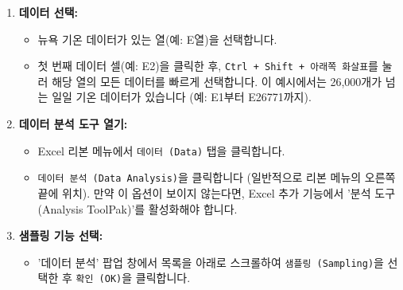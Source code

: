 \documentclass[11pt,a4paper]{book}
\newcommand{\excel}[1]{\texttt{#1}}
\theoremstyle{definition}
\begin{document}
\begin{enumerate}
    \item \textbf{데이터 선택:}
    \begin{itemize}
        \item 뉴욕 기온 데이터가 있는 열(예: E열)을 선택합니다.
        \item 첫 번째 데이터 셀(예: E2)을 클릭한 후, \excel{Ctrl + Shift + 아래쪽 화살표}를 눌러 해당 열의 모든 데이터를 빠르게 선택합니다. 이 예시에서는 26,000개가 넘는 일일 기온 데이터가 있습니다 (예: E1부터 E26771까지).
    \end{itemize}

    \item \textbf{데이터 분석 도구 열기:}
    \begin{itemize}
        \item Excel 리본 메뉴에서 \excel{데이터 (Data)} 탭을 클릭합니다.
        \item \excel{데이터 분석 (Data Analysis)}을 클릭합니다 (일반적으로 리본 메뉴의 오른쪽 끝에 위치). 만약 이 옵션이 보이지 않는다면, Excel 추가 기능에서 '분석 도구(Analysis ToolPak)'를 활성화해야 합니다.
    \end{itemize}

    \item \textbf{샘플링 기능 선택:}
    \begin{itemize}
        \item '데이터 분석' 팝업 창에서 목록을 아래로 스크롤하여 \excel{샘플링 (Sampling)}을 선택한 후 \excel{확인 (OK)}을 클릭합니다.
    \end{itemize}


\end{enumerate}
\end{document}
